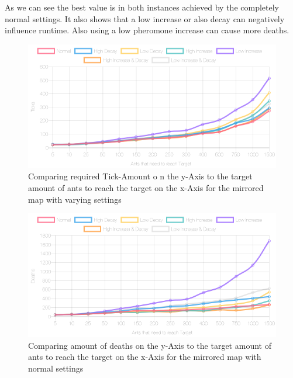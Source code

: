 As we can see the best value is in both instances achieved by the completely normal settings. It also shows that a low increase or also decay can negatively influence runtime. Also using a low pheromone increase can cause more deaths.

\begin{figure}[H]
  \centering
  \includegraphics[width=1\linewidth]{images/mirrorednormalpheromticks}
  \caption{Comparing required Tick-Amount o n the y-Axis to the target amount of ants to reach the target on the x-Axis for the mirrored map with varying settings}
  \label{fig:diffsettings2}
\end{figure}

\begin{figure}[H]
  \centering
  \includegraphics[width=1\linewidth]{images/mirroredwittowerdeaths}
  \caption{Comparing amount of deaths on the y-Axis to the target amount of ants to reach the target on the x-Axis for the mirrored map with normal settings}
  \label{fig:diffsetting2sdeath}
\end{figure}